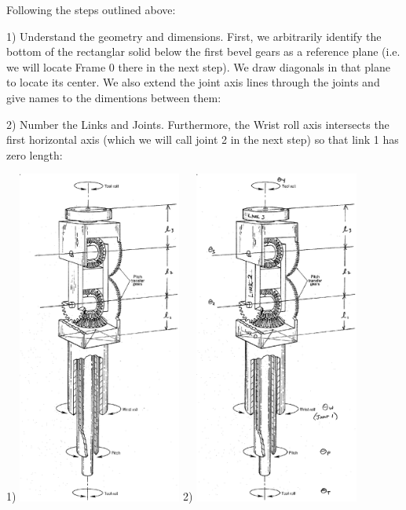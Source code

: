 \newpage
\begin{ExampleCont}
Following the steps outlined above:

1) Understand the geometry and dimensions.   First, we arbitrarily identify the bottom of the rectanglar solid below the first bevel gears as a reference plane (i.e. we will locate Frame 0 there in the next step).  We draw diagonals in that plane to locate its center.  We also extend the joint axis lines through the joints and give names to the dimentions between them:



2) Number the Links and Joints.   Furthermore, the Wrist roll axis intersects the first horizontal axis (which we will call joint 2 in the next step) so that link 1 has zero length:

1) \includegraphics[width=5.38cm]{figs03/00421.eps} 2) \includegraphics[width=5.38cm]{figs03/00422.eps}

\end{ExampleCont}

